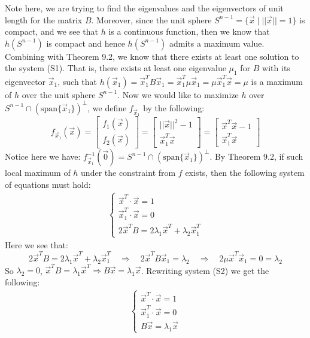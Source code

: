 \documentclass[15pt]{book}
\theoremstyle{break}
\theoremstyle{break}
\newcommand{\spa}{\text{span}}
\begin{document}
Note here, we are trying to find the eigenvalues and the eigenvectors of unit length for the matrix $B$. Moreover, since the unit sphere $S^{n-1} = \{\vec{x}\mid ||\vec{x}|| = 1\}$ is compact, and we see that $h$ is a continuous function, then we know that $h(S^{n-1})$ is compact and hence $h(S^{n-1})$ admits a maximum value. Combining with Theorem 9.2, we know that there exists at least one solution to the system (S1). That is, there exists at least one eigenvalue $\mu_1$ for $B$ with its eigenvector $\vec{x}_1$, such that $h(\vec{x}_1) = \vec{x}_1^TB\vec{x}_1 = \vec{x}_1^T\mu\vec{x}_1 = \mu\vec{x}_1^T\vec{x}=\mu$ is a maximum of $h$ over the unit sphere $S^{n-1}$. Now we would like to maximize $h$ over $S^{n-1}\cap (\spa\{ \vec{x}_1\})^\perp$, we define $f_{\vec{x}_1}$ by the following:
$$f_{\vec{x}_1}(\vec{x}) =\begin{bmatrix}
 f_1(\vec{x}) \\ f_2(\vec{x})
\end{bmatrix} = \begin{bmatrix}
||\vec{x}||^2 - 1 \\ \vec{x}_1^T\vec{x}
\end{bmatrix} = \begin{bmatrix}
\vec{x}^T\vec{x}-1 \\ \vec{x}_1^T\vec{x}
\end{bmatrix}$$
Notice here we have: $f_{\vec{x}_1}^{-1}(\vec{0}) = S^{n-1}\cap (\spa\{ \vec{x}_1\})^\perp$.
By Theorem 9.2, if such local maximum of $h$ under the constraint from $f$ exists, then the following system of equations must hold:
\begin{align*}
\begin{cases}
\vec{x}^T \cdot \vec{x} = 1\\
\vec{x}_1^T\cdot \vec{x} = 0\\
2\vec{x}^TB = 2\lambda_1 \vec{x}^T + \lambda_2 \vec{x}_1^T 
\end{cases} \tag{S2}
\end{align*}
Here we see that:
$$2\vec{x}^TB = 2\lambda_1 \vec{x}^T + \lambda_2 \vec{x}_1^T \quad \Rightarrow\quad 2\vec{x}^T B \vec{x}_1 = \lambda_2 \quad \Rightarrow\quad 2\mu\vec{x}^T\vec{x}_1 = 0 = \lambda_2$$
So $\lambda_2 = 0$, $\vec{x}^TB = \lambda_1 \vec{x}^T \Rightarrow B\vec{x} = \lambda_1 \vec{x}$. Rewriting system (S2) we get the following:
\begin{align*}
\begin{cases}
\vec{x}^T \cdot \vec{x} = 1\\
\vec{x}_1^T\cdot \vec{x} = 0\\
B\vec{x} = \lambda_1 \vec{x}
\end{cases} \tag{S3}
\end{align*}
\end{document}
